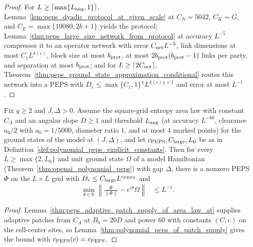 \begin{proof}\leanok
    For $L\ge\lceil\max\{L_{\rm ang},1\}\rceil$, Lemma~\ref{lem:peps_dyadic_protocol_at_given_scale} at $C_N=5042$, $C_K=G$, and $C_E=\max\{10080,2b+1\}$ yields the protocol; Lemma~\ref{thm:peps_large_size_network_from_protocol} at accuracy $L^{-5}$ compresses it to an operator network with error $C_{\rm net}L^{-5}$, link dimensions at most $C_1L^{k(c)}$, block size at most $b_{\rm prot}$, at most $2b_{\rm prot}(b_{\rm prot}-1)$ links per party, and separation at most $b_{\rm prot}$; and for $L\ge\lceil2C_{\rm net}\rceil$, Theorem~\ref{thm:peps_ground_state_approximation_conditional} routes this network into a PEPS with $D_e\le\max\{C_1,1\}^\chi L^{k(c)\chi+1}$ and error at most $L^{-1}$.
\end{proof}

\begin{lemma}
    \label{thm:polynomial_peps_of_ratios}
    \leanok
    Fix $q\ge2$ and $J,\Delta>0$. Assume the square-grid entropy area law with constant $C_A$ and an angular slope $D\ge1$ and threshold $L_{\rm ang}$ (at accuracy $L^{-60}$, clearance $a_0/2$ with $a_0=1/5000$, diameter ratio $1$, and at most $4$ marked points) for the ground states of the model at $(J,\Delta)$, and let $c_{\rm PEPS},C_{\rm large},L_0$ be as in Definition~\ref{def:polynomial_peps_explicit_constants}. Then for every $L\ge\max\{2,L_0\}$ and unit ground state $\Omega$ of a model Hamiltonian (Theorem~\ref{thm:openai_polynomial_peps}) with gap $\Delta$, there is a nonzero PEPS $\Phi$ on the $L\times L$ grid with $D_e\le C_{\rm large}L^{c_{\rm PEPS}}$ and
    \begin{align}
        \min_{\theta\in\mathbb R}
        \left\|\frac{\Phi}{\|\Phi\|}-e^{i\theta}\Omega\right\| & \le L^{-1}.
    \end{align}
\end{lemma}

\begin{proof}\leanok
    Lemma~\ref{thm:peps_adaptive_patch_supply_of_area_law_at} supplies adaptive patches from $C_A$ at $B_0=20D$ and power $60$ with constants $(C,c)$ on the cell-center sites, so Lemma~\ref{thm:polynomial_peps_of_patch_supply} gives the bound with $c_{\rm PEPS}(c)=c_{\rm PEPS}$.
\end{proof}

